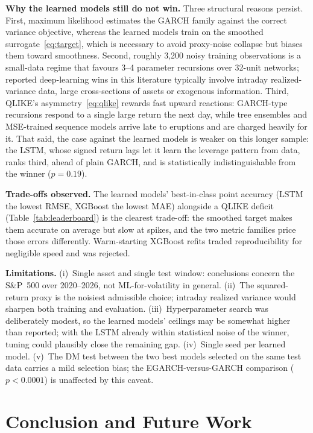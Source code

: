 \documentclass[a4paper,twocolumn,10pt]{article}
\begin{document}
\textbf{Why the learned models still do not win.} Three structural reasons persist. First, maximum likelihood estimates the GARCH family against the correct variance objective, whereas the learned models train on the smoothed surrogate~\eqref{eq:target}, which is necessary to avoid proxy-noise collapse but biases them toward smoothness. Second, roughly 3{,}200 noisy training observations is a small-data regime that favours 3--4 parameter recursions over 32-unit networks; reported deep-learning wins in this literature typically involve intraday realized-variance data, large cross-sections of assets or exogenous information. Third, QLIKE's asymmetry~\eqref{eq:qlike} rewards fast upward reactions: GARCH-type recursions respond to a single large return the next day, while tree ensembles and MSE-trained sequence models arrive late to eruptions and are charged heavily for it. That said, the case against the learned models is weaker on this longer sample: the LSTM, whose signed return lags let it learn the leverage pattern from data, ranks third, ahead of plain GARCH, and is statistically indistinguishable from the winner ($p=0.19$).

\textbf{Trade-offs observed.} The learned models' best-in-class point accuracy (LSTM the lowest RMSE, XGBoost the lowest MAE) alongside a QLIKE deficit (Table~\ref{tab:leaderboard}) is the clearest trade-off: the smoothed target makes them accurate on average but slow at spikes, and the two metric families price those errors differently. Warm-starting XGBoost refits traded reproducibility for negligible speed and was rejected.

\textbf{Limitations.} (i)~Single asset and single test window: conclusions concern the S\&P~500 over 2020--2026, not ML-for-volatility in general. (ii)~The squared-return proxy is the noisiest admissible choice; intraday realized variance would sharpen both training and evaluation. (iii)~Hyperparameter search was deliberately modest, so the learned models' ceilings may be somewhat higher than reported; with the LSTM already within statistical noise of the winner, tuning could plausibly close the remaining gap. (iv)~Single seed per learned model. (v)~The DM test between the two best models selected on the same test data carries a mild selection bias; the EGARCH-versus-GARCH comparison ($p<0.0001$) is unaffected by this caveat.

\section{Conclusion and Future Work}
\end{document}
